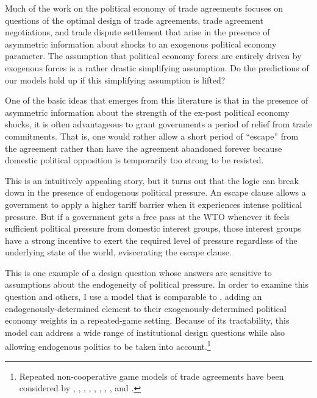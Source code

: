 Much of the work on the political economy of trade agreements focuses on questions of the optimal design of trade agreements, trade agreement negotiations, and trade dispute settlement that arise in the presence of asymmetric information about shocks to an exogenous political economy parameter. The assumption that political economy forces are entirely driven by exogenous forces is a rather drastic simplifying assumption. Do the predictions of our models hold up if this simplifying assumption is lifted?

One of the basic ideas that emerges from this literature is that in the presence of asymmetric information about the strength of the ex-post political economy shocks, it is often advantageous to grant governments a period of relief from trade commitments. That is, one would rather allow a short period of ``escape'' from the agreement rather than have the agreement abandoned forever because domestic political opposition is temporarily too strong to be resisted.

This is an intuitively appealing story, but it turns out that the logic can break down in the presence of endogenous political pressure. An escape clause allows a government to apply a higher tariff barrier when it experiences intense political pressure. But if a government gets a free pass at the WTO whenever it feels sufficient political pressure from domestic interest groups, those interest groups have a strong incentive to exert the required level of pressure regardless of the underlying state of the world, eviscerating the escape clause.

This is one example of a design question whose answers are sensitive to assumptions about the endogeneity of political pressure. In order to examine this question and others, I use a model that is comparable to \Textcite{bs2005}, adding an endogenously-determined element to their exogenously-determined political economy weights in a repeated-game setting. Because of its tractability, this model can address a wide range of institutional design questions while also allowing endogenous politics to be taken into account.\footnote{Repeated non-cooperative game models of trade agreements have been considered by \Textcite{mcm86,mcm89}, \Textcite{dixit1987}, \Textcite{bs1990, bs1997a, bs1997b, bs2002}, \Textcite{kovthurs}, \Textcite{maggi99}, \Textcite{ederington}, \Textcite{rosendorff}, \Textcite{bagwell2009}, and \Textcite{park}.}

